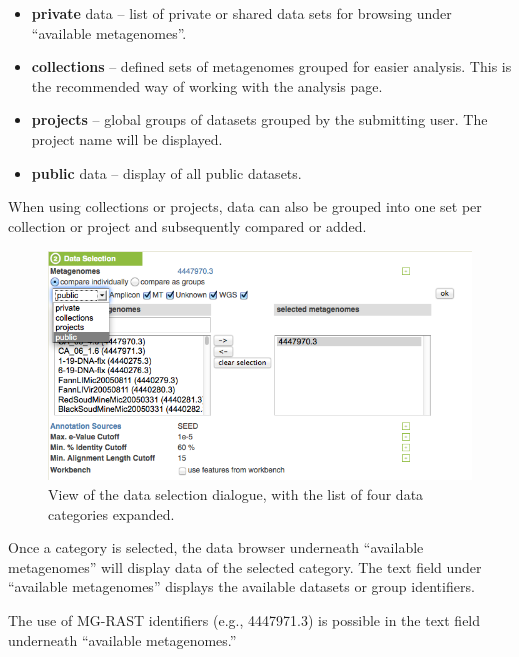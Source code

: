 \documentclass[12pt,fullpage]{report}
\begin{document}
\begin{itemize}
\item \textbf{private} data --
list of private or shared data sets for browsing under ``available metagenomes''.

\item \textbf{collections} --
defined sets of metagenomes grouped for easier analysis. This is the recommended way of working with the analysis page.

\item \textbf{projects} --
global groups of datasets grouped by the submitting user. The project name will be displayed.

\item \textbf{public} data --
display of all public datasets.

\end{itemize}

When using collections or projects, data can also be grouped into one set per collection or project and subsequently compared or added.

\begin{figure}
\begin{center}
\includegraphics[width=6in]{Images/Data-selection-expanded.png}
\end{center}
\caption{
View of the data selection dialogue, with the list of four data categories expanded.
}
\label{fig:Data-selection-expanded}
\end{figure}

Once a category is selected, the data browser underneath ``available metagenomes'' will display data of the selected category. The text field under ``available metagenomes'' displays the available datasets or group identifiers.

The use of MG-RAST identifiers (e.g., 4447971.3) is possible in the text field underneath ``available metagenomes.''
\end{document}
